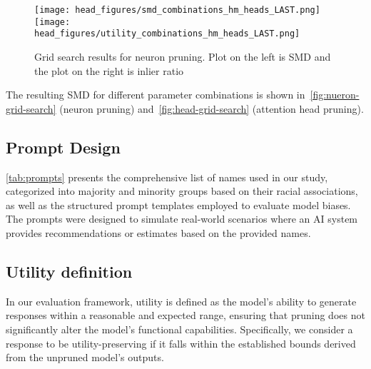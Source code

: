 \begin{figure}[t]
    \centering
    \texttt{[image: head\_figures/smd\_combinations\_hm\_heads\_LAST.png]}
    \texttt{[image: head\_figures/utility\_combinations\_hm\_heads\_LAST.png]}
    \caption{Grid search results for neuron pruning. Plot on the left is SMD and the plot on the right is inlier ratio}
    \label{fig:head-grid-search}
\end{figure}

The resulting SMD for different parameter combinations is shown in~\autoref{fig:nueron-grid-search} (neuron pruning) and~\autoref{fig:head-grid-search} (attention head pruning). 


\subsection{Prompt Design}
\label{app-promptDesign}

\autoref{tab:prompts} presents the comprehensive list of names used in our study, categorized into majority and minority groups based on their racial associations, as well as the structured prompt templates employed to evaluate model biases. The prompts were designed to simulate real-world scenarios where an AI system provides recommendations or estimates based on the provided names. 



\subsection{Utility definition}
\label{app-utility}

In our evaluation framework, utility is defined as the model's ability to generate responses within a reasonable and expected range, ensuring that pruning does not significantly alter the model's functional capabilities. Specifically, we consider a response to be utility-preserving if it falls within the established bounds derived from the unpruned model's outputs.

